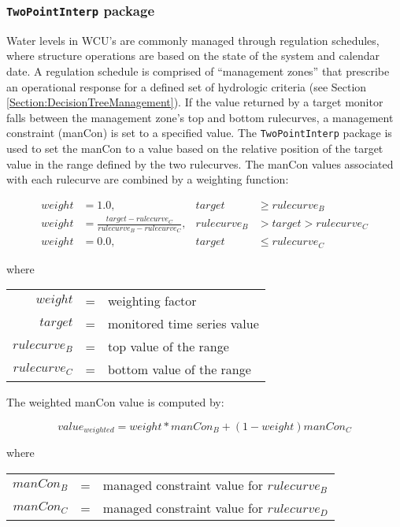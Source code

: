 \subsubsection{{\tt TwoPointInterp} package}

Water levels in WCU's are commonly managed through regulation
schedules, where structure operations are based on the state of the
system and calendar date.  A regulation schedule is comprised of
``management zones'' that prescribe an operational response for a
defined set of hydrologic criteria (see Section
\ref{Section:DecisionTreeManagement}).  If the value returned by a
target monitor falls between the management zone's top and bottom
rulecurves, a management constraint (manCon) is set to a specified
value.  The {\tt TwoPointInterp} package is used to set the manCon to
a value based on the relative position of the target value in the
range defined by the two rulecurves.  The manCon values associated
with each rulecurve are combined by a weighting function:

\begin{align}
  weight &= 1.0,& target &\ge rulecurve_B \\
  weight &= \frac{target - rulecurve_C}{rulecurve_B - rulecurve_C},& rulecurve_B &> target > rulecurve_C \\
  weight &= 0.0, &target &\le rulecurve_C 
\end{align}

where 
\begin{center}
\begin{tabular}{rcl}
	$weight$	&=& weighting factor					\\
	$target$	&=& monitored time series value				\\
	$rulecurve_B$	&=& top value of the range				\\
	$rulecurve_C$	&=& bottom value of the range				\\
\end{tabular}
\end{center}

The weighted manCon value is computed by:

\begin{equation}
	value_{weighted} = weight * manCon_B + (1-weight) manCon_C
\end{equation}

where 
\begin{center}
\begin{tabular}{rcl}
	$manCon_B$	&=& managed constraint value for $rulecurve_B$	\\
	$manCon_C$	&=& managed constraint value for $rulecurve_D$	\\
\end{tabular}
\end{center}

